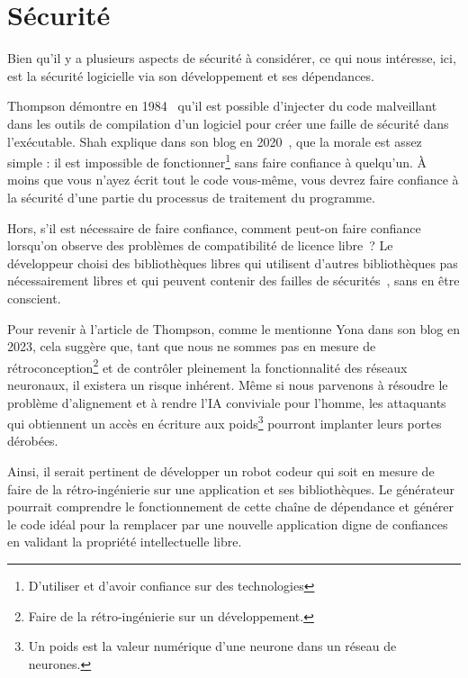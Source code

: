 
\section{Sécurité}

Bien qu'il y a plusieurs aspects de sécurité à considérer, ce qui nous intéresse, ici, est la sécurité logicielle via son développement et ses dépendances.

Thompson démontre en 1984~\cite{thompson_trusting_1984} qu'il est possible d'injecter du code malveillant dans les outils de compilation d'un logiciel pour créer une faille de sécurité dans l'exécutable. Shah explique dans son blog en 2020~\cite{discussion_reflection_trusting_2020}, que la morale est assez simple : il est impossible de fonctionner\footnote{D'utiliser et d'avoir confiance sur des technologies} sans faire confiance à quelqu'un. À moins que vous n'ayez écrit tout le code vous-même, vous devrez faire confiance à la sécurité d'une partie du processus de traitement du programme.

Hors, s'il est nécessaire de faire confiance, comment peut-on faire confiance lorsqu'on observe des problèmes de compatibilité de licence libre~\cite{pfeiffer2022license}\cite{8667977}? Le développeur choisi des bibliothèques libres qui utilisent d'autres bibliothèques pas nécessairement libres et qui peuvent contenir des failles de sécurités~\cite{10.1145/3133956.3134048}, sans en être conscient. 

Pour revenir à l'article de Thompson, comme le mentionne Yona dans son blog en 2023, cela suggère que, tant que nous ne sommes pas en mesure de rétroconception\footnote{Faire de la rétro-ingénierie sur un développement.} et de contrôler pleinement la fonctionnalité des réseaux neuronaux, il existera un risque inhérent. Même si nous parvenons à résoudre le problème d'alignement et à rendre l'IA conviviale pour l'homme, les attaquants qui obtiennent un accès en écriture aux poids\footnote{Un poids est la valeur numérique d'une neurone dans un réseau de neurones.} pourront implanter leurs portes dérobées.~\cite{discussion_reflection_trusting_ia_2023}

Ainsi, il serait pertinent de développer un robot codeur qui soit en mesure de faire de la rétro-ingénierie sur une application et ses bibliothèques. Le générateur pourrait comprendre le fonctionnement de cette chaîne de dépendance et générer le code idéal pour la remplacer par une nouvelle application digne de confiances en validant la propriété intellectuelle libre.

